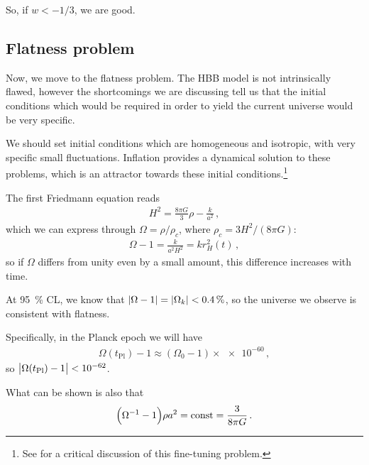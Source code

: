 \documentclass[main.tex]{subfiles}
\begin{document}
So, if \(w < - 1/3\), we are good. 


\subsection{Flatness problem}

Now, we move to the flatness problem. 
The HBB model is not intrinsically flawed, however the shortcomings we are discussing tell us that the initial conditions which would be required in order to yield the current universe would be very specific.

We should set initial conditions which are homogeneous and isotropic, with very specific small fluctuations. Inflation provides a dynamical solution to these problems, which is an attractor towards these initial conditions.\footnote{See \textcite[]{hossenfelderScreamsExplanationFinetuning2019} for a critical discussion of this fine-tuning problem.}

The first Friedmann equation reads 
%
\begin{align}
H^2=  \frac{8 \pi G}{3} \rho - \frac{k}{a^2}
\,,
\end{align}
%
which we can express through \(\Omega = \rho / \rho _c\), where \(\rho _c = 3 H^2 / (8 \pi G) \): 
%
\begin{align}
\Omega - 1 = \frac{k}{a^2 H^2} = k r_H^2 (t)
\,,
\end{align}
%
so if \(\Omega \) differs from unity even by a small amount, this difference increases with time. 

At \SI{95}{\percent} CL, we know that \(\abs{\Omega - 1} = \abs{\Omega _k} < \SI{.4}{\percent}\), so the universe we observe is consistent with flatness. 

Specifically, in the Planck epoch we will have 
%
\begin{align}
\Omega (t _{\text{Pl}}) - 1 \approx  (\Omega_0 - 1) \times \num{e-60}
\,,
\end{align}
%
so \(\abs{\Omega (t _{\text{Pl}}) - 1} < \num{e-62}\).

What can be shown is also that 
%
\begin{align}
\qty(\Omega^{-1} - 1) \rho a^2 = \text{const} = \frac{3}{8 \pi G}
\,.
\end{align}
\end{document}

